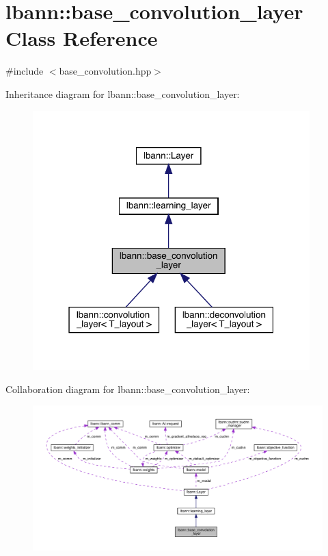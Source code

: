 \hypertarget{classlbann_1_1base__convolution__layer}{}\section{lbann\+:\+:base\+\_\+convolution\+\_\+layer Class Reference}
\label{classlbann_1_1base__convolution__layer}


{\ttfamily \#include $<$base\+\_\+convolution.\+hpp$>$}



Inheritance diagram for lbann\+:\+:base\+\_\+convolution\+\_\+layer\+:\nopagebreak
\begin{figure}[H]
\begin{center}
\leavevmode
\includegraphics[width=304pt]{classlbann_1_1base__convolution__layer__inherit__graph}
\end{center}
\end{figure}


Collaboration diagram for lbann\+:\+:base\+\_\+convolution\+\_\+layer\+:\nopagebreak
\begin{figure}[H]
\begin{center}
\leavevmode
\includegraphics[width=350pt]{classlbann_1_1base__convolution__layer__coll__graph}
\end{center}
\end{figure}
